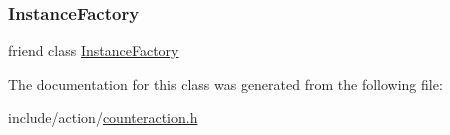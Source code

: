 \subsubsection{\texorpdfstring{InstanceFactory}{InstanceFactory}}
{\footnotesize\ttfamily friend class \mbox{\hyperlink{classgraphsat_1_1_instance_factory}{Instance\+Factory}}\hspace{0.3cm}{\ttfamily [friend]}}



The documentation for this class was generated from the following file\+:\begin{DoxyCompactItemize}
\item 
include/action/\mbox{\hyperlink{counteraction_8h}{counteraction.\+h}}\end{DoxyCompactItemize}
